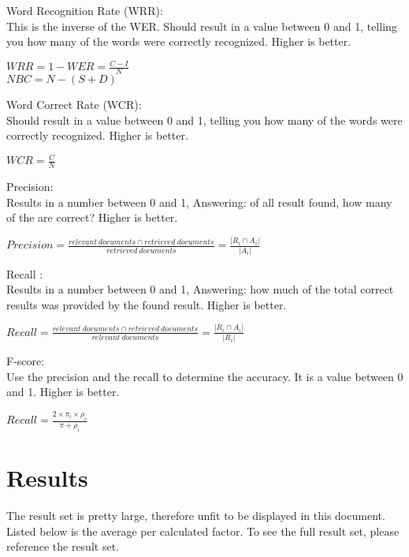 \documentclass{article}
\begin{document}
    Word Recognition Rate (WRR): \\
    This is the inverse of the WER. Should result in a value between 0 and 1, telling you how many of the words were correctly recognized. Higher is better.
    \begin{center}
    $ WRR = 1 - WER = \frac{C - I}{N}$ \\
    $ NBC =N - (S + D)$ \\
    \end{center} 
    
    Word Correct Rate (WCR): \\
    Should result in a value between 0 and 1, telling you how many of the words were correctly recognized. Higher is better.
    \begin{center}
    $ WCR = \frac{C}{N}$ \\
    \end{center} 
    
    Precision: \\
    Results in a number between 0 and 1, Answering: of all result found, how many of the are correct? Higher is better.
    \begin{center}
    $ Precision = \frac{relevant\ documents \cap retrieved\ documents}{retrieved\ documents} = \frac{|R_i \cap A_i|}{|A_i|} $ \\
    \end{center} 
    
    Recall : \\
    Results in a number between 0 and 1, Answering: how much of the total correct results was provided by the found result. Higher is better.
    \begin{center}
    $ Recall = \frac{relevant\ documents \cap retrieved\ documents}{relevant\ documents} = \frac{|R_i \cap A_i|}{|R_i|} $ \\
    \end{center} 
    
    F-score: \\
    Use the precision and the recall to determine the accuracy. It is a value between 0 and 1. Higher is better.
    \begin{center}
    $ Recall = \frac{2 \times \pi_i \times \rho_i}{\pi + \rho_i} $\\
    \end{center} 


\section{Results} \label{Results}
The result set is pretty large, therefore unfit to be displayed in this document. Listed below is the average per calculated factor. To see the full result set, please reference the result set\cite{ResultSet}.
\end{document}
